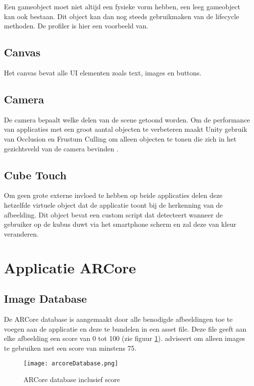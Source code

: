 Een gameobject moet niet altijd een fysieke vorm hebben, een leeg gameobject kan ook bestaan. Dit object kan dan nog steeds gebruikmaken van de lifecycle methoden. De profiler is hier een voorbeeld van.

\subsection{Canvas}
Het canvas bevat alle UI elementen zoals text, images en buttons.

\subsection{Camera}
De camera bepaalt welke delen van de scene getoond worden. Om de performance van applicaties met een groot aantal objecten te verbeteren maakt Unity gebruik van Occlusion en Frustum Culling om alleen objecten te tonen die zich in het gezichtsveld van de camera bevinden \autocite{UnityCulling}.

\subsection{Cube Touch}
Om geen grote externe invloed te hebben op beide applicaties delen deze hetzelfde virtuele object dat de applicatie toont bij de herkenning van de afbeelding. Dit object bevat een custom script dat detecteert wanneer de gebruiker op de kubus duwt via het smartphone scherm en zal deze van kleur veranderen.

\section{Applicatie ARCore}

\subsection{Image Database}
De ARCore database is aangemaakt door alle benodigde afbeeldingen toe te voegen aan de applicatie en deze te bundelen in een asset file. Deze file geeft aan elke afbeelding een score van 0 tot 100 (zie figuur \ref{fig:arcoreDatabase}). \textcite{GoogleImages} adviseert om alleen images te gebruiken met een score van minstens 75.

\begin{figure}
    \texttt{[image: arcoreDatabase.png]}
    \caption{ARCore database inclusief score}
    \label{fig:arcoreDatabase}
\end{figure}

